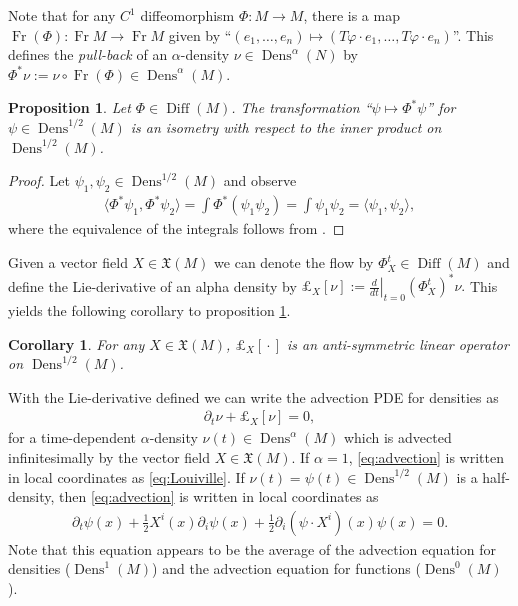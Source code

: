 \documentclass[letterpaper, 12 pt]{amsart}
\newtheorem{prop}[thm]{Proposition}
\newtheorem{cor}[thm]{Corollary}
\DeclareMathOperator{\Diff}{Diff}
\DeclareMathOperator{\Fr}{Fr}
\DeclareMathOperator{\Dens}{Dens}
\begin{document}
  Note that for any $C^1$ diffeomorphism $\Phi:M \to M$,
  there is a map $\Fr(\Phi) : \Fr M \to \Fr M$
  given by 
  ``$(e_1,\dots,e_n) \mapsto (T\varphi \cdot e_1, \dots, T\varphi \cdot e_n)$''.
  This defines the \emph{pull-back} of an $\alpha$-density
  $\nu \in \Dens^\alpha(N)$
  by $\Phi^* \nu := \nu \circ \Fr(\Phi) \in \Dens^\alpha(M)$.
  \begin{prop} \label{prop:isom}
    Let $\Phi \in \Diff(M)$.
    The transformation ``$\psi \mapsto \Phi^* \psi$'' for
    $\psi \in \Dens^{1/2}(M)$ is an isometry with respect
    to the inner product on $\Dens^{1/2}(M)$.
  \end{prop}
  \begin{proof}
    Let $\psi_1,\psi_2 \in \Dens^{1/2}(M)$ and observe
    \begin{align*}
      \langle \Phi^* \psi_1, \Phi^* \psi_2 \rangle
      = \int \Phi^*( \psi_1 \psi_2)
      = \int \psi_1 \psi_2
      = \langle \psi_1, \psi_2 \rangle,
    \end{align*}
    where the equivalence of the integrals follows
    from \cite[Proposition 14.32(c)]{Lee2006}.
  \end{proof}
  
  Given a vector field $X \in \mathfrak{X}(M)$
  we can denote the flow by $\Phi^t_X \in \Diff(M)$
  and define the Lie-derivative of an alpha density by
  $
    \pounds_X[ \nu ] := \left. \frac{d}{dt} \right|_{t=0} (\Phi_X^t)^* \nu.
  $
  This yields the following corollary to proposition \ref{prop:isom}.
  \begin{cor}
    For any $X \in \mathfrak{X}(M)$, $\pounds_X[ {}\cdot{} ]$
    is an anti-symmetric linear operator on $\Dens^{1/2}(M)$.
  \end{cor}
  With the Lie-derivative defined we can write the advection
  PDE for densities as
  \begin{align}
    \partial_t \nu + \pounds_X[\nu] = 0 \label{eq:advection},
  \end{align}
  for a time-dependent $\alpha$-density $\nu(t) \in \Dens^\alpha(M)$
  which is advected infinitesimally by the vector field 
  $X \in \mathfrak{X}(M)$.
  If $\alpha = 1$, \eqref{eq:advection} is written in local coordinates
  as \eqref{eq:Louiville}.
  If $\nu(t) = \psi(t) \in \Dens^{1/2}(M)$ is a half-density, then
  \eqref{eq:advection} is written in local coordinates as
  \begin{align*}
    \partial_t \psi(x) 
    + \frac{1}{2} X^i(x) \partial_i \psi(x) 
    + \frac{1}{2} \partial_i (\psi \cdot X^i)(x) \psi(x) = 0.
  \end{align*}
  Note that this equation appears to be the average of the advection equation for densities ($\Dens^1(M)$) and the advection equation for functions ($\Dens^0(M)$).
\end{document}
